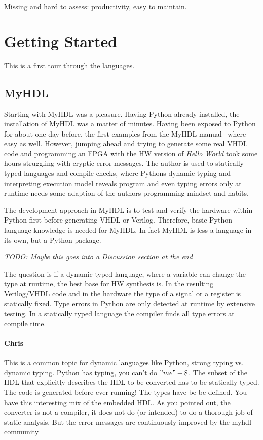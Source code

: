 \documentclass[10pt, technote, draftcls, onecolumn]{IEEEtran}
\newcommand{\todo}[1]{{\emph{TODO: #1}}}
\newcommand{\comment}[3]{\paragraph*{\textbf{#1}}{\color{#3}#2}}
\newcommand{\cfelton}[1]{\comment{Chris}{#1}{Blue}}
\begin{document}
Missing and hard to assess: productivity, easy to maintain.

\section{Getting Started}

This is a first tour through the languages.

\subsection{MyHDL}

Starting with MyHDL was a pleasure. Having Python already installed, the installation
of MyHDL was a matter of minutes. Having been exposed to Python for about one
day before, the first examples from the MyHDL manual~\cite{myhdl:2010} where easy as well.
However, jumping ahead and trying to generate some real VHDL code and programming
an FPGA with the HW version of \emph{Hello World} took some hours struggling
with cryptic error messages. The author is used to statically typed languages and
compile checks, where Pythons dynamic typing and interpreting execution model
reveals program and even typing errors only at runtime needs some adaption of
the authors programming mindset and habits.

The development approach in MyHDL is to test and verify the hardware within Python first
before generating VHDL or Verilog. Therefore, basic Python language knowledge is
needed for MyHDL. In fact MyHDL is less a language in its own, but a Python package.

\todo{Maybe this goes into a Discussion section at the end}

The question is if a dynamic typed language, where a variable can change the type
at runtime, the best base for HW synthesis is. In the resulting Verilog/VHDL code and
in the hardware the type of a signal or a register is statically fixed. Type errors in
Python are only detected at runtime by extensive testing. In a statically typed
language the compiler finds all type errors at compile time.

\cfelton{This is a common topic for dynamic languages like Python, strong typing
vs. dynamic typing.  Python has typing, you can't do $"me"+8$.  The subset of 
the HDL that explicitly describes the HDL to be converted has to be statically
typed.  The code is generated before ever running!  The types have be be defined.
You have this interesting mix of the embedded HDL.  As you pointed out, the converter
is not a compiler, it does not do (or intended) to do a thorough job of static 
analysis.  But the error messages are continuously improved by the myhdl community}
\end{document}
